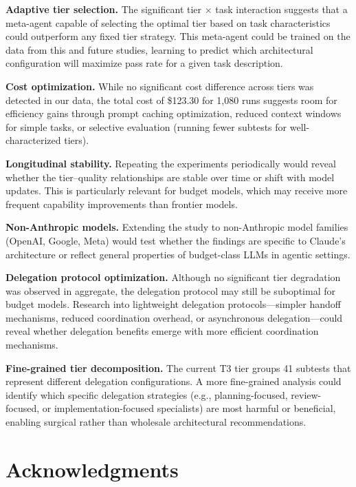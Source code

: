 \documentclass[11pt]{article}
\begin{document}
\textbf{Adaptive tier selection.} The significant tier $\times$ task
interaction suggests that a meta-agent capable of selecting the optimal tier
based on task characteristics could outperform any fixed tier strategy. This
meta-agent could be trained on the data from this and future studies,
learning to predict which architectural configuration will maximize pass rate
for a given task description.

\textbf{Cost optimization.} While no significant cost difference across tiers
was detected in our data, the total cost of \$123.30 for 1,080 runs suggests
room for efficiency gains through prompt caching optimization, reduced context
windows for simple tasks, or selective evaluation (running fewer subtests for
well-characterized tiers).

\textbf{Longitudinal stability.} Repeating the experiments periodically would
reveal whether the tier--quality relationships are stable over time or shift
with model updates. This is particularly relevant for budget models, which
may receive more frequent capability improvements than frontier models.

\textbf{Non-Anthropic models.} Extending the study to non-Anthropic model
families (OpenAI, Google, Meta) would test whether the findings are specific
to Claude's architecture or reflect general properties of budget-class LLMs
in agentic settings.

\textbf{Delegation protocol optimization.} Although no significant tier
degradation was observed in aggregate, the delegation protocol may still
be suboptimal for budget models. Research into lightweight delegation
protocols---simpler handoff mechanisms, reduced coordination overhead, or
asynchronous delegation---could reveal whether delegation benefits emerge
with more efficient coordination mechanisms.

\textbf{Fine-grained tier decomposition.} The current T3 tier groups 41
subtests that represent different delegation configurations. A more
fine-grained analysis could identify which specific delegation strategies
(e.g., planning-focused, review-focused, or implementation-focused specialists)
are most harmful or beneficial, enabling surgical rather than wholesale
architectural recommendations.

\section*{Acknowledgments}
\end{document}
